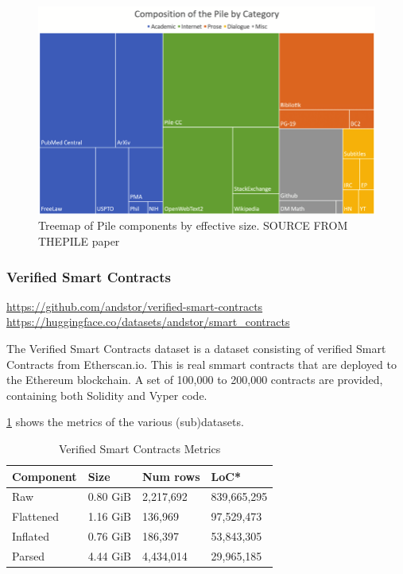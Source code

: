 \begin{figure}[htp]
    \centering
    \includegraphics[width=\textwidth]{figures/Treemap-of-Pile-components-by-effective-size.png}
    \caption{Treemap of Pile components by effective size. SOURCE FROM THEPILE paper}
    \label{fig:flowchart}
\end{figure}


\subsubsection{Verified Smart Contracts}
\label{sec:verified-smart-contracts}
\url{https://github.com/andstor/verified-smart-contracts}
\url{https://huggingface.co/datasets/andstor/smart_contracts}

The Verified Smart Contracts dataset is a dataset consisting of verified Smart Contracts from Etherscan.io. This is real smmart contracts that are deployed to the Ethereum blockchain. A set of 100,000 to 200,000 contracts are provided, containing both Solidity and Vyper code.

\cref{tab:verified-smart-contracts-metrics} shows the metrics of the various (sub)datasets.

\begin{table}
    \def\arraystretch{1.5}
    \small
    \centering
    \caption{Verified Smart Contracts Metrics}
    \label{tab:verified-smart-contracts-metrics}
    \begin{tabularx}{\textwidth}{XXXX}
        \toprule
        \textbf{Component} & \textbf{Size} &  \textbf{Num rows} & \textbf{LoC*}\\
        \midrule
        Raw & 0.80 GiB & 2,217,692 & 839,665,295\\
        Flattened & 1.16 GiB & 136,969 & 97,529,473\\
        Inflated & 0.76 GiB & 186,397 & 53,843,305\\
        Parsed & 4.44 GiB & 4,434,014 & 29,965,185\\
        \bottomrule
    \end{tabularx}
\end{table}

